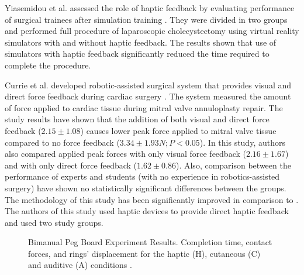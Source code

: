 Yiasemidou et al. assessed the role of haptic feedback by evaluating performance of surgical trainees after simulation training \cite{yiasemidou_faster_2011}. They were divided in two groups and performed full procedure of laparoscopic cholecystectomy using virtual reality simulators with and without haptic feedback.  The results shown that use of simulators with haptic feedback significantly reduced the time required to complete the procedure.

Currie et al. developed robotic-assisted surgical system that provides visual and direct force feedback during cardiac surgery \cite{currie_role_2017}. The system measured the amount of force applied to cardiac tissue during mitral valve annuloplasty repair. The study results have shown that the addition of both visual and direct force feedback ($2.15 \pm 1.08$) causes lower peak force applied to mitral valve tissue compared to no force feedback ($3.34 \pm 1.93 N; P < 0.05$). In this study, authors also compared applied peak forces with only visual force feedback ($2.16 \pm 1.67$) and with only direct force feedback ($1.62 \pm 0.86$). Also, comparison between the performance of experts and students (with no experience in robotics-assisted surgery) have shown no statistically significant differences between the groups. The methodology of this study has been significantly improved in comparison to \cite{bethea_application_2004}. The authors of this study\cite{currie_role_2017} used haptic devices to provide direct haptic feedback and used two study groups.


\begin{figure}[h]%
\centering
{}%
\qquad
{}
\caption[Bimanual Peg Board Experiment Results]{Bimanual Peg Board Experiment Results. Completion time, contact forces, and rings' displacement for the haptic (H), cutaneous (C) and auditive (A) conditions \cite{pacchierotti_2016}.}
\label{fig:peg_results}%
\end{figure}

